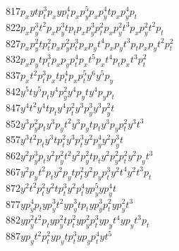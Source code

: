 \begin{tabbing}
817\>$p_xy  t  p_t^3    $\>$p_xy  p_t^4       $\>$p_xp_y^5          $\>$p_xp_y^4 t        $\>$p_xp_y^4 p_t      $\\
822\>$p_xp_y^3 t  ^2    $\>$p_xp_y^3 t  p_t   $\>$p_xp_y^3 p_t^2    $\>$p_xp_y^2 t  ^3    $\>$p_xp_y^2 t  ^2 p_t$\\
827\>$p_xp_y^2 t  p_t^2 $\>$p_xp_y^2 p_t^3    $\>$p_xp_yt  ^4       $\>$p_xp_yt  ^3 p_t   $\>$p_xp_yt  ^2 p_t^2 $\\
832\>$p_xp_yt  p_t^3    $\>$p_xp_yp_t^4       $\>$p_xt  ^5          $\>$p_xt  ^4 p_t      $\>$p_xt  ^3 p_t^2    $\\
837\>$p_xt  ^2 p_t^3    $\>$p_xt  p_t^4       $\>$p_xp_t^5          $\>$y  ^6             $\>$y  ^5 p_y         $\\
842\>$y  ^5 t           $\>$y  ^5 p_t         $\>$y  ^4 p_y^2       $\>$y  ^4 p_yt        $\>$y  ^4 p_yp_t      $\\
847\>$y  ^4 t  ^2       $\>$y  ^4 t  p_t      $\>$y  ^4 p_t^2       $\>$y  ^3 p_y^3       $\>$y  ^3 p_y^2 t     $\\
852\>$y  ^3 p_y^2 p_t   $\>$y  ^3 p_yt  ^2    $\>$y  ^3 p_yt  p_t   $\>$y  ^3 p_yp_t^2    $\>$y  ^3 t  ^3       $\\
857\>$y  ^3 t  ^2 p_t   $\>$y  ^3 t  p_t^2    $\>$y  ^3 p_t^3       $\>$y  ^2 p_y^4       $\>$y  ^2 p_y^3 t     $\\
862\>$y  ^2 p_y^3 p_t   $\>$y  ^2 p_y^2 t  ^2 $\>$y  ^2 p_y^2 t  p_t$\>$y  ^2 p_y^2 p_t^2 $\>$y  ^2 p_yt  ^3    $\\
867\>$y  ^2 p_yt  ^2 p_t$\>$y  ^2 p_yt  p_t^2 $\>$y  ^2 p_yp_t^3    $\>$y  ^2 t  ^4       $\>$y  ^2 t  ^3 p_t   $\\
872\>$y  ^2 t  ^2 p_t^2 $\>$y  ^2 t  p_t^3    $\>$y  ^2 p_t^4       $\>$y  p_y^5          $\>$y  p_y^4 t        $\\
877\>$y  p_y^4 p_t      $\>$y  p_y^3 t  ^2    $\>$y  p_y^3 t  p_t   $\>$y  p_y^3 p_t^2    $\>$y  p_y^2 t  ^3    $\\
882\>$y  p_y^2 t  ^2 p_t$\>$y  p_y^2 t  p_t^2 $\>$y  p_y^2 p_t^3    $\>$y  p_yt  ^4       $\>$y  p_yt  ^3 p_t   $\\
887\>$y  p_yt  ^2 p_t^2 $\>$y  p_yt  p_t^3    $\>$y  p_yp_t^4       $\>$y  t  ^5          $\>

\end{tabbing}
